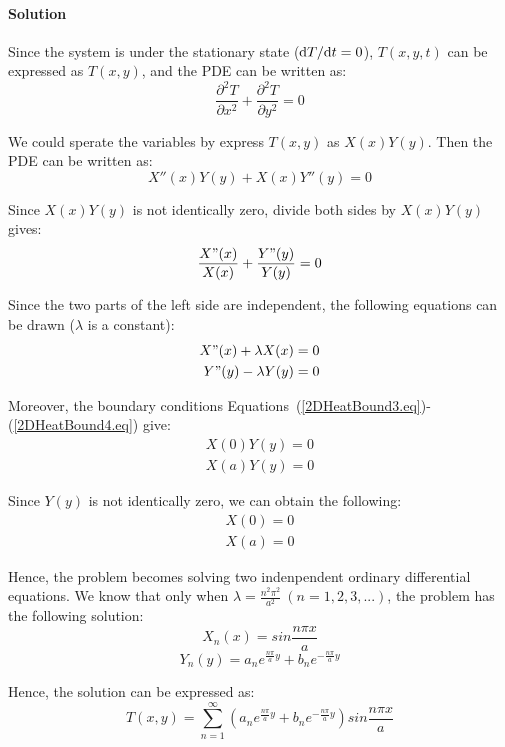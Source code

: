 \paragraph{Solution}
Since the system is under the stationary state ($\mathrm d T/\mathrm d t=0$), $T(x,y,t)$ can be expressed as $T(x,y)$, and the PDE can be written as:
\begin{equation}
\frac{\partial^2T}{\partial x^2}+\frac{\partial^2T}{\partial y^2}=0
\end{equation}

We could sperate the variables by express $T(x,y)$ as $X(x)Y(y)$. Then the PDE can be written as:
\begin{equation}
X''(x)Y(y)+X(x)Y''(y)=0
\end{equation}

Since $X(x)Y(y)$ is not identically zero, divide both sides by $X(x)Y(y)$ gives:
\begin{equation}
\frac{X"(x)}{X(x)}+\frac{Y"(y)}{Y(y)}=0
\end{equation}

Since the two parts of the left side are independent, the following equations can be drawn ($\lambda$ is a constant):
\begin{align}
X"(x)+\lambda X(x)=0\\
Y"(y)-\lambda Y(y)=0
\end{align}

Moreover, the boundary conditions Equations~(\ref{2DHeatBound3.eq})-(\ref{2DHeatBound4.eq}) give:
\begin{align}
X(0)Y(y)=0\\
X(a)Y(y)=0
\end{align}

Since $Y(y)$ is not identically zero, we can obtain the following:
\begin{align}
X(0)=0\\
X(a)=0
\end{align}

Hence, the problem becomes solving two indenpendent ordinary differential equations. We know that only when $\lambda=\frac{n^2\pi^2}{a^2}\ (n=1,2,3,...)$, the problem has the following solution:
\begin{equation}
X_n(x)=sin\frac{n\pi x}{a}
\end{equation}
\begin{equation}
Y_n(y)=a_ne^{\frac{n\pi}{a}y}+b_ne^{-\frac{n\pi}{a}y}
\end{equation}

Hence, the solution can be expressed as:
\begin{equation}
T(x,y)=\sum_{n=1}^{\infty}(a_ne^{\frac{n\pi}{a}y}+b_ne^{-\frac{n\pi}{a}y})sin\frac{n\pi x}{a}
\end{equation}

